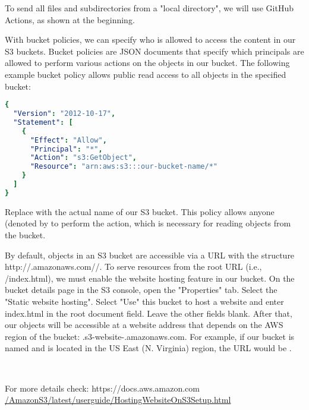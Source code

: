 To send all files and subdirectories from a "local directory", we will use GitHub Actions, as shown at the beginning.

With bucket policies, we can specify who is allowed to access the content in our S3 buckets. Bucket policies are JSON 
documents that specify which principals are allowed to perform various actions on the objects in our bucket. The 
following example bucket policy allows public read access to all objects in the specified bucket:

\begin{lstlisting}[language=yaml]
{
  "Version": "2012-10-17",
  "Statement": [
    {
      "Effect": "Allow",
      "Principal": "*",
      "Action": "s3:GetObject",
      "Resource": "arn:aws:s3:::our-bucket-name/*"
    }
  ]
}
\end{lstlisting}

\noindent Replace  with the actual name of our S3 bucket. This policy allows anyone (denoted by 
 to perform the  action, which is necessary for reading objects from the bucket.

By default, objects in an S3 bucket are accessible via a URL with the structure http://.amazonaws.com//. To serve 
resources from the root URL (i.e., /index.html), we must enable the website hosting feature in our bucket. On the bucket 
details page in the S3 console, open the "Properties" tab. Select the "Static website hosting". Select "Use" this bucket 
to host a website and enter index.html in the root document field. Leave the other fields blank.
After that, our objects will be accessible at a website address that depends on the AWS region of the bucket: 
.s3-website-.amazonaws.com. For example, if our bucket is named  and is located in the US East (N. 
Virginia) region, the URL would be .

~

\noindent For more details check: https://docs.aws.amazon.com\\
\href{https://docs.aws.amazon.com/AmazonS3/latest/userguide/HostingWebsiteOnS3Setup.html}{/AmazonS3/latest/userguide/HostingWebsiteOnS3Setup.html}

